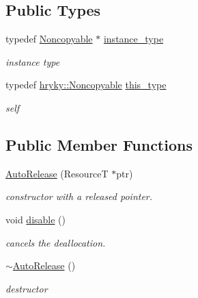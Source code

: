 \subsection*{Public Types}
\begin{DoxyCompactItemize}
\item 
\hypertarget{classhryky_1_1_noncopyable_aaf87abb55f700af85ecb0895f6178821}{typedef \hyperlink{classhryky_1_1_noncopyable}{Noncopyable} $\ast$ \hyperlink{classhryky_1_1_noncopyable_aaf87abb55f700af85ecb0895f6178821}{instance\-\_\-type}}\label{classhryky_1_1_noncopyable_aaf87abb55f700af85ecb0895f6178821}

\begin{DoxyCompactList}\small\item\em instance type \end{DoxyCompactList}\item 
\hypertarget{classhryky_1_1_noncopyable_acf13ad1c98a76247a561dff514979da5}{typedef \hyperlink{classhryky_1_1_noncopyable}{hryky\-::\-Noncopyable} \hyperlink{classhryky_1_1_noncopyable_acf13ad1c98a76247a561dff514979da5}{this\-\_\-type}}\label{classhryky_1_1_noncopyable_acf13ad1c98a76247a561dff514979da5}

\begin{DoxyCompactList}\small\item\em self \end{DoxyCompactList}\end{DoxyCompactItemize}
\subsection*{Public Member Functions}
\begin{DoxyCompactItemize}
\item 
\hyperlink{structhryky_1_1_auto_release_a2ca03b9a40a76106b96a3b112e470a15}{Auto\-Release} (Resource\-T $\ast$ptr)
\begin{DoxyCompactList}\small\item\em constructor with a released pointer. \end{DoxyCompactList}\item 
\hypertarget{structhryky_1_1_auto_release_ac65949fad34210bc5e981daadf36fab1}{void \hyperlink{structhryky_1_1_auto_release_ac65949fad34210bc5e981daadf36fab1}{disable} ()}\label{structhryky_1_1_auto_release_ac65949fad34210bc5e981daadf36fab1}

\begin{DoxyCompactList}\small\item\em cancels the deallocation. \end{DoxyCompactList}\item 
\hypertarget{structhryky_1_1_auto_release_ac8b9d3b97aeb9bc2c27783161e2df552}{\hyperlink{structhryky_1_1_auto_release_ac8b9d3b97aeb9bc2c27783161e2df552}{$\sim$\-Auto\-Release} ()}\label{structhryky_1_1_auto_release_ac8b9d3b97aeb9bc2c27783161e2df552}

\begin{DoxyCompactList}\small\item\em destructor \end{DoxyCompactList}\end{DoxyCompactItemize}


